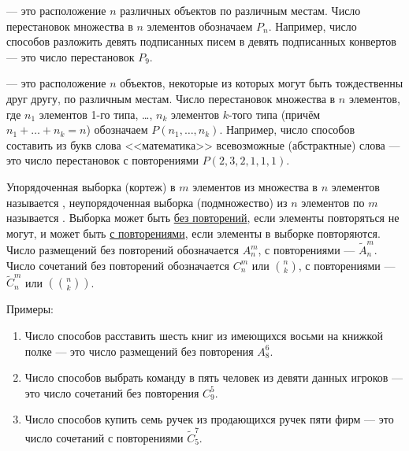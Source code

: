  --- это расположение $n$ различных объектов по различным местам.
Число перестановок множества в $n$ элементов обозначаем $P_n$. Например, число способов разложить девять подписанных писем в девять подписанных конвертов --- это число перестановок $P_9$.


 --- это расположение $n$ объектов, некоторые из которых могут быть тождественны друг другу, по различным местам.
Число перестановок множества в $n$ элементов, где $n_1$ элементов 1-го типа, \ldots, $n_k$ элементов $k$-того типа (причём $n_1+\ldots+n_k=n$) обозначаем $P(n_1, \ldots, n_k)$. Например, число способов составить из букв слова <<математика>> всевозможные (абстрактные) слова --- это число перестановок с повторениями $P(2,3,2,1,1,1)$.

Упорядоченная выборка (кортеж) в $m$ элементов из множества в $n$ элементов называется , неупорядоченная выборка (подмножество) из $n$ элементов по $m$ называется .
Выборка может быть \underline{без повторений}, если элементы повторяться не могут, и может быть \underline{с повторениями}, если элементы в выборке повторяются. 
Число размещений без повторений обозначается $A_n^m$, с повторениями --- $\widetilde{A}_n^m$.
Число сочетаний без повторений обозначается $C_n^m$ или $\binom{n}{k}$, с повторениями --- $\widetilde{C}_n^m$ или $\left(\binom{n}{k}\right)$.

Примеры:
\begin{enumerate}
	\item Число способов расставить шесть книг из имеющихся восьми на книжкой полке --- это число размещений без повторения $A_{8}^{6}$.
	\item Число способов выбрать команду в пять человек из девяти данных игроков --- это число сочетаний без повторения $C_9^5$.
	\item Число способов купить семь ручек из продающихся ручек пяти фирм --- это число сочетаний с повторениями $\widetilde{C}_5^7$.
\end{enumerate}


